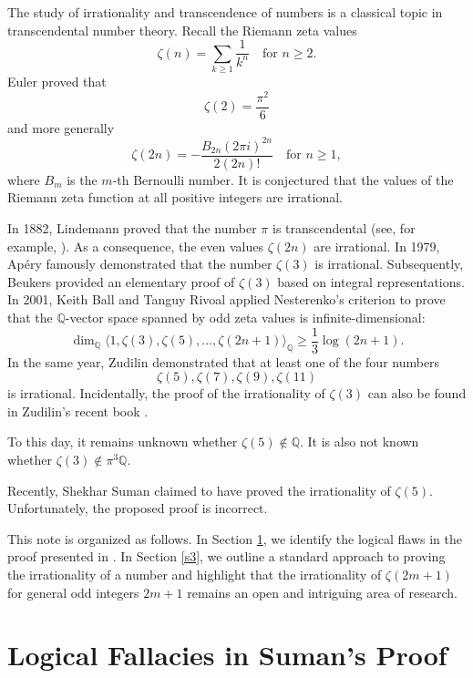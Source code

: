 \documentclass[12pt,reqno]{amsart}
\theoremstyle{definition}
\numberwithin{equation}{section}
\begin{document}
The study of irrationality and transcendence of numbers is a classical topic in transcendental number theory. Recall the Riemann zeta values
\[
\zeta(n) = \sum_{k \geq 1} \frac{1}{k^n} \quad \text{for } n \geq 2.
\] Euler proved that
\[
\zeta(2) = \frac{\pi^2}{6}
\]
and more generally
\[
\zeta(2n) = -\frac{B_{2n} (2\pi i)^{2n}}{2 (2n)!} \quad \text{for } n \geq 1,
\]
where \( B_m \) is the \( m \)-th Bernoulli number. It is conjectured that the values of the Riemann zeta function at all positive integers are irrational.  

In 1882, Lindemann proved that the number \(\pi\) is transcendental (see, for example, \cite[Theorem 1.2]{Waldschmidt2013}). As a consequence, the even values \(\zeta(2n)\) are irrational. In 1979, Ap\'{e}ry \cite{Apery1979} famously demonstrated that the number \(\zeta(3)\) is irrational. Subsequently, Beukers \cite{Beukers1979} provided an elementary proof of \(\zeta(3)\) based on integral representations. In 2001, Keith Ball and Tanguy Rivoal \cite[Th\'{e}or\`{e}me
 1]{BallRivoal2001} applied Nesterenko’s criterion to prove that the \(\mathbb{Q}\)-vector space spanned by odd zeta values is infinite-dimensional:
\[
\operatorname{dim}_{\mathbb{Q}} \langle 1, \zeta(3), \zeta(5), \ldots, \zeta(2n+1) \rangle_{\mathbb{Q}} \geq  \frac{1}{3}\log(2n+1).
\] In the same year, Zudilin \cite{Zudilin2001} demonstrated that at least one of the four numbers
\[
\zeta(5), \zeta(7), \zeta(9), \zeta(11)
\]
is irrational. Incidentally, the proof of the irrationality of \(\zeta(3)\) can also be found in Zudilin's recent book \cite[Section 7]{Zudilin2023}.



To this day, it remains unknown whether \(\zeta(5) \notin \mathbb{Q}\). It is also not known whether \(\zeta(3) \notin \pi^3 \mathbb{Q}\).

Recently, Shekhar Suman \cite{Suman2024} claimed to have proved the irrationality of \(\zeta(5)\). Unfortunately, the proposed proof is incorrect.  

This note is organized as follows. In Section \ref{s2}, we identify the logical flaws in the proof presented in \cite{Suman2024}. In Section \ref{s3}, we outline a standard approach to proving the irrationality of a number and highlight that the irrationality of \(\zeta(2m+1)\) for general odd integers \(2m+1\) remains an open and intriguing area of research.


\section{Logical Fallacies in Suman's Proof}\label{s2}
\end{document}
